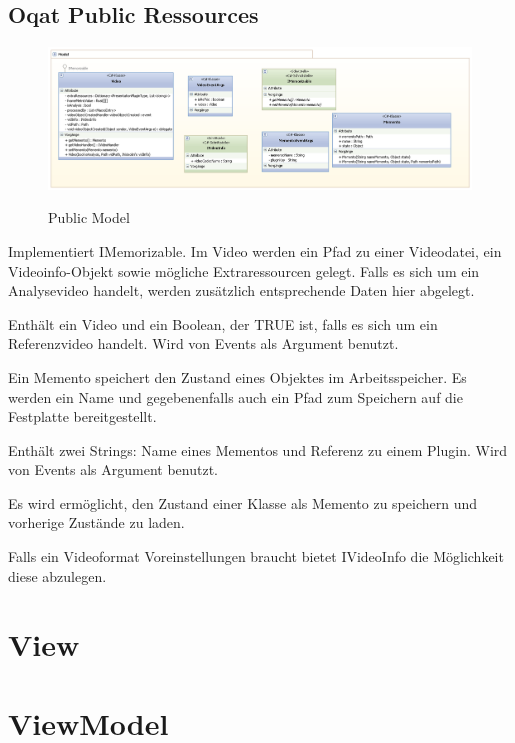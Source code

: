 \pagebreak
\subsection{Oqat Public Ressources}
\begin{figure}[h]
\noindent\includegraphics[width=\linewidth,height=\textheight,
keepaspectratio]{bilder/Modell2.png}
\label{}
\caption{Public Model}
\end{figure}



Implementiert IMemorizable. Im Video werden ein Pfad zu einer Videodatei, ein Videoinfo-Objekt sowie mögliche Extraressourcen gelegt. Falls es sich um ein Analysevideo handelt, werden zusätzlich entsprechende Daten hier abgelegt.


Enthält ein Video und ein Boolean, der TRUE ist, falls es sich um ein Referenzvideo handelt. Wird von Events als Argument benutzt.


Ein Memento speichert den Zustand eines Objektes im Arbeitsspeicher. Es werden ein Name und gegebenenfalls auch ein Pfad zum Speichern auf die Festplatte bereitgestellt.


Enthält zwei Strings: Name eines Mementos und Referenz zu einem Plugin. Wird von Events als Argument benutzt.


Es wird ermöglicht, den Zustand einer Klasse als Memento zu speichern und vorherige Zustände zu laden.


Falls ein Videoformat Voreinstellungen braucht bietet IVideoInfo die Möglichkeit diese abzulegen.

\pagebreak
\section{View}



\pagebreak
\section{ViewModel}


